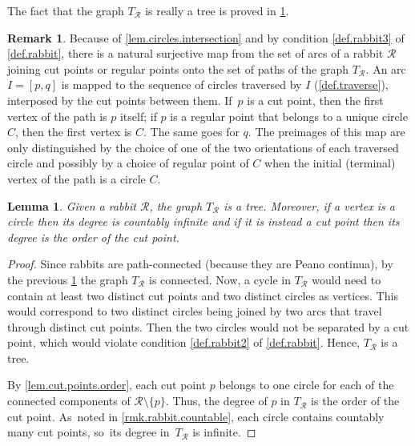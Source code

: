 \documentclass[10pt,a4paper]{amsart}
\newtheorem{lemma}[lemma]{Lemma}
\theoremstyle{definition}
\newtheorem{remark}[remark]{Remark}
\newcommand{\R}{\mathcal{R}}
\begin{document}
The fact that the graph $T_\R$ is really a tree is proved in \cref{lem.tree.of.circles.is.tree}.

\begin{remark}
\label{rmk.arcs.and.paths}
Because of \cref{lem.circles.intersection} and by condition \cref{def.rabbit3} of \cref{def.rabbit}, there is a natural surjective map from the set of arcs of a rabbit $\R$ joining cut points or regular points onto the set of paths of the graph $T_\R$.
An arc $I = [p,q]$ is mapped to the sequence of circles traversed by $I$ (\cref{def.traverse}), interposed by the cut points between them. If~$p$ is a cut point, then the first vertex of the path is $p$ itself;
if $p$ is a regular point that belongs to a unique circle $C$, then the first vertex is $C$.
The same goes for $q$.
The preimages of this map are only distinguished by the choice of one of the two orientations of each traversed circle and possibly by a choice of regular point of $C$ when the initial (terminal) vertex of the path is a circle $C$.
\end{remark}

\begin{lemma}
\label{lem.tree.of.circles.is.tree}
Given a rabbit $\R$, the graph $T_\R$ is a tree.
Moreover, if a vertex is a circle then its degree is countably infinite and if it is instead a cut point then its degree is the order of the cut point.
\end{lemma}

\begin{proof}
Since rabbits are path-connected (because they are Peano continua), by the previous \cref{rmk.arcs.and.paths} the graph $T_\R$ is connected.
Now, a cycle in $T_\R$ would need to contain at least two distinct cut points and two distinct circles as vertices.
This would correspond to two distinct circles being joined by two arcs that travel through distinct cut points.
Then the two circles would not be separated by a cut point, which would violate condition \cref{def.rabbit2} of \cref{def.rabbit}.
Hence, $T_\R$ is a tree.

By \cref{lem.cut.points.order}, each cut point $p$ belongs to one circle for each of the connected components of $\R \setminus \{p\}$.
Thus, the degree of $p$ in $T_\R$ is the order of the cut point. As~noted in \cref{rmk.rabbit.countable}, each circle contains countably many cut points, so~its degree in~$T_\R$ is infinite.
\end{proof}
\end{document}
